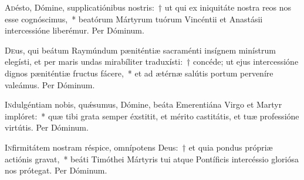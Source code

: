 \documentclass[vesperale_romanum.tex]{subfiles}
\begin{document}
\semiduplex


\oratio

\lettrine{A}{d}ésto, Dómine, supplicatiónibus nostris:~† ut qui ex iniquitáte nostra reos nos esse cognóscimus,~* beatórum Mártyrum tuórum Vincéntii et Anastásii intercessióne liberémur.
Per Dóminum.


\myrule



\semiduplexmtv

\oratio

\lettrine{D}{e}us, qui beátum Raymúndum pæniténtiæ sacraménti insígnem minístrum elegísti, et per maris undas mirabíliter traduxísti:~† concéde; ut ejus intercessióne dignos pæniténtiæ fructus fácere,~* et ad ætérnæ salútis portum perveníre valeámus.
Per Dóminum.



\oratio

\lettrine{I}{n}dulgéntiam nobis, quǽsumus, Dómine, beáta Emerentiána Virgo et Martyr implóret:~* quæ tibi grata semper éxstitit, et mérito castitátis, et tuæ professióne virtútis. Per Dóminum.

\vespsequentiscomm

\myrule
{}

\duplex

\oratio

\lettrine{I}{n}firmitátem nostram réspice, omnípotens Deus:~† et quia pondus própriæ actiónis gravat,~* beáti Timóthei Mártyris tui atque Pontíficis intercéssio gloriósa nos prótegat.
Per Dóminum.
\end{document}
